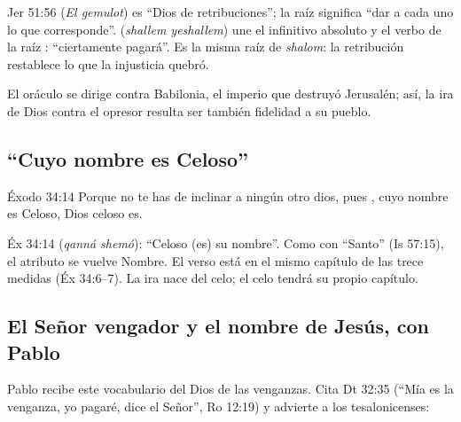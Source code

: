 \begin{filologiatexto}{Jer 51:56}
 (\emph{El gemulot}) es ``Dios de retribuciones''; la raíz  significa ``dar a cada uno lo que corresponde''.  (\emph{shallem yeshallem}) une el infinitivo absoluto y el verbo de la raíz : ``ciertamente pagará''. Es la misma raíz de \emph{shalom}: la retribución restablece lo que la injusticia quebró.
\end{filologiatexto}

El oráculo se dirige contra Babilonia, el imperio que destruyó Jerusalén; así, la ira de Dios contra el opresor resulta ser también fidelidad a su pueblo.

\subsection{“Cuyo nombre es Celoso”}
\begin{verso}{Éxodo 34:14}
Porque no te has de inclinar a ningún otro dios, pues \SENOR{}, cuyo nombre es Celoso, Dios celoso es.
\end{verso}

\begin{filologiatexto}{Éx 34:14}
 (\emph{qanná shemó}): ``Celoso (es) su nombre''. Como con ``Santo'' (Is 57:15), el atributo se vuelve Nombre. El verso está en el mismo capítulo de las trece medidas (Éx 34:6--7). La ira nace del celo; el celo tendrá su propio capítulo.
\end{filologiatexto}


\subsection{El Señor vengador y el nombre de Jesús, con Pablo}
Pablo recibe este vocabulario del Dios de las venganzas. Cita Dt 32:35 (``Mía es la venganza, yo pagaré, dice el Señor'', Ro 12:19) y advierte a los tesalonicenses:

